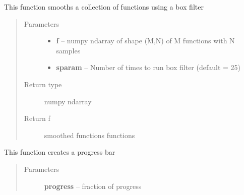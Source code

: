 \documentclass[letterpaper,10pt,english]{sphinxmanual}
\begin{document}

\begin{fulllineitems}
\label{utility_functions:utility_functions.smooth_data}
This function smooths a collection of functions using a box filter
\begin{quote}\begin{description}
\item[{Parameters}] \leavevmode\begin{itemize}
\item {} 
\textbf{f} -- numpy ndarray of shape (M,N) of M functions with N samples

\item {} 
\textbf{sparam} -- Number of times to run box filter (default = 25)

\end{itemize}

\item[{Return type}] \leavevmode
numpy ndarray

\item[{Return f}] \leavevmode
smoothed functions functions

\end{description}\end{quote}

\end{fulllineitems}


\begin{fulllineitems}
\label{utility_functions:utility_functions.update_progress}
This function creates a progress bar
\begin{quote}\begin{description}
\item[{Parameters}] \leavevmode
\textbf{progress} -- fraction of progress

\end{description}\end{quote}

\end{fulllineitems}

\end{document}
